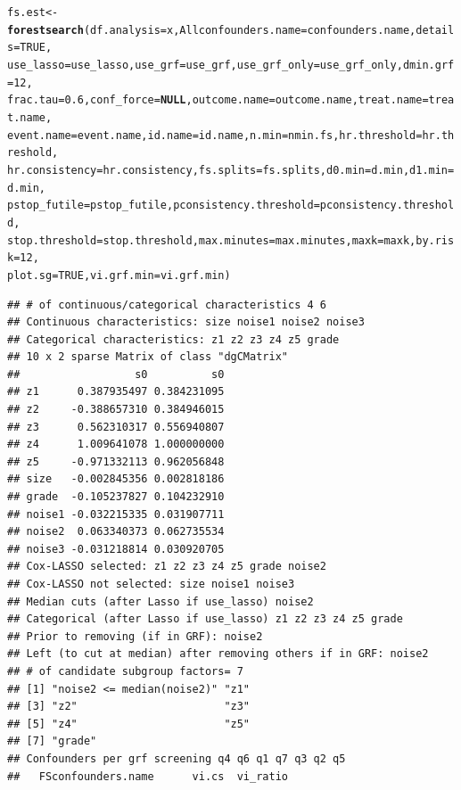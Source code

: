 \documentclass[smallextended]{svjour3}
\makeatletter
\newcommand{\hlnum}[1]{\textcolor[rgb]{0.686,0.059,0.569}{#1}}%
\newcommand{\hlstd}[1]{\textcolor[rgb]{0.345,0.345,0.345}{#1}}%
\newcommand{\hlkwa}[1]{\textcolor[rgb]{0.161,0.373,0.58}{\textbf{#1}}}%
\newcommand{\hlkwb}[1]{\textcolor[rgb]{0.69,0.353,0.396}{#1}}%
\newcommand{\hlkwc}[1]{\textcolor[rgb]{0.333,0.667,0.333}{#1}}%
\newcommand{\hlkwd}[1]{\textcolor[rgb]{0.737,0.353,0.396}{\textbf{#1}}}%
\newenvironment{kframe}{%
 \def\at@end@of@kframe{}%
 \ifinner\ifhmode%
  \def\at@end@of@kframe{\end{minipage}}%
  \begin{minipage}{\columnwidth}%
 \fi\fi%
 \def\FrameCommand##1{\hskip\@totalleftmargin \hskip-\fboxsep
 \colorbox{shadecolor}{##1}\hskip-\fboxsep
     \hskip-\linewidth \hskip-\@totalleftmargin \hskip\columnwidth}%
 \MakeFramed {\advance\hsize-\width
   \@totalleftmargin\z@ \linewidth\hsize
   \@setminipage}}%
 {\par\unskip\endMakeFramed%
 \at@end@of@kframe}
\newenvironment{knitrout}{}{} %
\makeatother
\begin{document}
\begin{knitrout}
\begin{kframe}
\begin{alltt}
\hlstd{fs.est} \hlkwb{<-} \hlkwd{forestsearch}\hlstd{(}\hlkwc{df.analysis} \hlstd{= x,} \hlkwc{Allconfounders.name} \hlstd{= confounders.name,} \hlkwc{details} \hlstd{=} \hlnum{TRUE}\hlstd{,}
    \hlkwc{use_lasso} \hlstd{= use_lasso,} \hlkwc{use_grf} \hlstd{= use_grf,} \hlkwc{use_grf_only} \hlstd{= use_grf_only,} \hlkwc{dmin.grf} \hlstd{=} \hlnum{12}\hlstd{,}
    \hlkwc{frac.tau} \hlstd{=} \hlnum{0.6}\hlstd{,} \hlkwc{conf_force} \hlstd{=} \hlkwa{NULL}\hlstd{,} \hlkwc{outcome.name} \hlstd{= outcome.name,} \hlkwc{treat.name} \hlstd{= treat.name,}
    \hlkwc{event.name} \hlstd{= event.name,} \hlkwc{id.name} \hlstd{= id.name,} \hlkwc{n.min} \hlstd{= nmin.fs,} \hlkwc{hr.threshold} \hlstd{= hr.threshold,}
    \hlkwc{hr.consistency} \hlstd{= hr.consistency,} \hlkwc{fs.splits} \hlstd{= fs.splits,} \hlkwc{d0.min} \hlstd{= d.min,} \hlkwc{d1.min} \hlstd{= d.min,}
    \hlkwc{pstop_futile} \hlstd{= pstop_futile,} \hlkwc{pconsistency.threshold} \hlstd{= pconsistency.threshold,}
    \hlkwc{stop.threshold} \hlstd{= stop.threshold,} \hlkwc{max.minutes} \hlstd{= max.minutes,} \hlkwc{maxk} \hlstd{= maxk,} \hlkwc{by.risk} \hlstd{=} \hlnum{12}\hlstd{,}
    \hlkwc{plot.sg} \hlstd{=} \hlnum{TRUE}\hlstd{,} \hlkwc{vi.grf.min} \hlstd{= vi.grf.min)}
\end{alltt}
\begin{verbatim}
## # of continuous/categorical characteristics 4 6 
## Continuous characteristics: size noise1 noise2 noise3 
## Categorical characteristics: z1 z2 z3 z4 z5 grade 
## 10 x 2 sparse Matrix of class "dgCMatrix"
##                  s0          s0
## z1      0.387935497 0.384231095
## z2     -0.388657310 0.384946015
## z3      0.562310317 0.556940807
## z4      1.009641078 1.000000000
## z5     -0.971332113 0.962056848
## size   -0.002845356 0.002818186
## grade  -0.105237827 0.104232910
## noise1 -0.032215335 0.031907711
## noise2  0.063340373 0.062735534
## noise3 -0.031218814 0.030920705
## Cox-LASSO selected: z1 z2 z3 z4 z5 grade noise2 
## Cox-LASSO not selected: size noise1 noise3 
## Median cuts (after Lasso if use_lasso) noise2 
## Categorical (after Lasso if use_lasso) z1 z2 z3 z4 z5 grade 
## Prior to removing (if in GRF): noise2 
## Left (to cut at median) after removing others if in GRF: noise2 
## # of candidate subgroup factors= 7 
## [1] "noise2 <= median(noise2)" "z1"                      
## [3] "z2"                       "z3"                      
## [5] "z4"                       "z5"                      
## [7] "grade"                   
## Confounders per grf screening q4 q6 q1 q7 q3 q2 q5 
##   FSconfounders.name      vi.cs  vi_ratio

\end{verbatim}
\end{kframe}
\end{knitrout}
\end{document}
